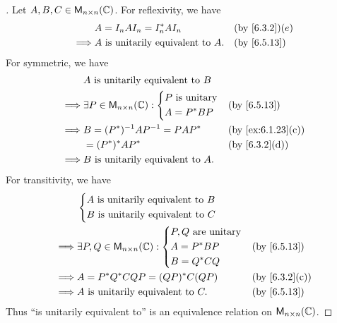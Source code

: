 \begin{proof}[]
	Let \(A, B, C \in \ms[n][n][\C]\).
	For reflexivity, we have
	\begin{align*}
		         & A = I_n A I_n = I_n^* A I_n              &  & \by{6.3.2}(e) \\
		\implies & A \text{ is unitarily equivalent to } A. &  & \by{6.5.13}
	\end{align*}
	For symmetric, we have
	\begin{align*}
		         & A \text{ is unitarily equivalent to } B                             \\
		\implies & \exists P \in \ms[n][n][\C] : \begin{dcases}
			                                         P \text{ is unitary} \\
			                                         A = P^* B P
		                                         \end{dcases} &  & \by{6.5.13}         \\
		\implies & B = (P^*)^{-1} A P^{-1} = P A P^*            &  & \by{ex:6.1.23}[c] \\
		         & = (P^*)^* A P^*                              &  & \by{6.3.2}[d]     \\
		\implies & B \text{ is unitarily equivalent to } A.
	\end{align*}
	For transitivity, we have
	\begin{align*}
		         & \begin{dcases}
			           A \text{ is unitarily equivalent to } B \\
			           B \text{ is unitarily equivalent to } C
		           \end{dcases}                            \\
		\implies & \exists P, Q \in \ms[n][n][\C] : \begin{dcases}
			                                            P, Q \text{ are unitary} \\
			                                            A = P^* B P              \\
			                                            B = Q^* C Q
		                                            \end{dcases} &  & \by{6.5.13}     \\
		\implies & A = P^* Q^* C Q P = (QP)^* C (QP)               &  & \by{6.3.2}[c] \\
		\implies & A \text{ is unitarily equivalent to } C.        &  & \by{6.5.13}
	\end{align*}
	Thus ``is unitarily equivalent to'' is an equivalence relation on \(\ms[n][n][\C]\).
\end{proof}
